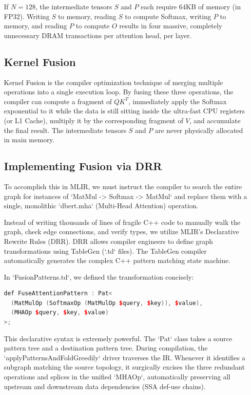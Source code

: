 If $N=128$, the intermediate tensors $S$ and $P$ each require 64KB of memory (in FP32). Writing $S$ to memory, reading $S$ to compute Softmax, writing $P$ to memory, and reading $P$ to compute $O$ results in four massive, completely unnecessary DRAM transactions per attention head, per layer.

\subsection{Kernel Fusion}
Kernel Fusion is the compiler optimization technique of merging multiple operations into a single execution loop. By fusing these three operations, the compiler can compute a fragment of $QK^T$, immediately apply the Softmax exponential to it while the data is still sitting inside the ultra-fast CPU registers (or L1 Cache), multiply it by the corresponding fragment of $V$, and accumulate the final result. The intermediate tensors $S$ and $P$ are never physically allocated in main memory.

\subsection{Implementing Fusion via DRR}
To accomplish this in MLIR, we must instruct the compiler to search the entire graph for instances of `MatMul -> Softmax -> MatMul` and replace them with a single, monolithic `dbert.mha` (Multi-Head Attention) operation.

Instead of writing thousands of lines of fragile C++ code to manually walk the graph, check edge connections, and verify types, we utilize MLIR's Declarative Rewrite Rules (DRR). DRR allows compiler engineers to define graph transformations using TableGen (`.td` files). The TableGen compiler automatically generates the complex C++ pattern matching state machine.

In `FusionPatterns.td`, we defined the transformation concisely:

\begin{lstlisting}[language=C++]
def FuseAttentionPattern : Pat<
  (MatMulOp (SoftmaxOp (MatMulOp $query, $key)), $value),
  (MHAOp $query, $key, $value)
>;
\end{lstlisting}

This declarative syntax is extremely powerful. The `Pat` class takes a source pattern tree and a destination pattern tree. During compilation, the `applyPatternsAndFoldGreedily` driver traverses the IR. Whenever it identifies a subgraph matching the source topology, it surgically excises the three redundant operations and splices in the unified `MHAOp`, automatically preserving all upstream and downstream data dependencies (SSA def-use chains).

